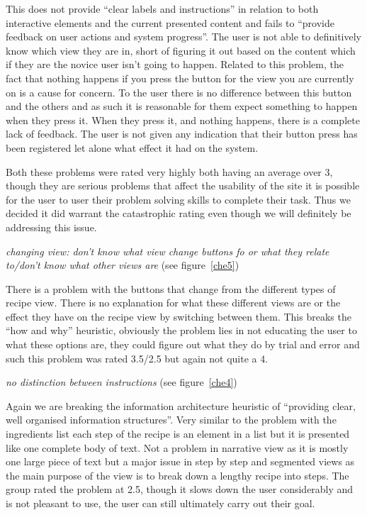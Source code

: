 This does not provide “clear labels and instructions” in relation to both interactive elements and the current presented content and fails to “provide feedback on user actions and system progress”. The user is not able to definitively know which view they are in, short of figuring it out based on the content which if they are the novice user isn’t going to happen. Related to this problem, the fact that nothing happens if you press the button for the view you are currently on is a cause for concern. To the user there is no difference between this button and the others and as such it is reasonable for them expect something to happen when they press it. When they press it, and nothing happens, there is a complete lack of feedback. The user is not given any indication that their button press has been registered let alone what effect it had on the system. 

Both these problems were rated very highly both having an average over 3, though they are serious problems that affect the usability of the site it is possible for the user to user their problem solving skills to complete their task. Thus we decided it did warrant the catastrophic rating even though we will definitely be addressing this issue.

\begin{center}
\emph{changing view: don't know what view change buttons fo or what they relate to/don't know what other views are} (see figure~\ref{che5})
\end{center}
There is a problem with the buttons that change from the different types of recipe view. There is no explanation for what these different views are or the effect they have on the recipe view by switching between them. This breaks the “how and why” heuristic, obviously the problem lies in not educating the user to what these options are, they could figure out what they do by trial and error and such this problem was rated 3.5/2.5 but again not quite a 4. 

\begin{center}
\emph{no distinction between instructions} (see figure~\ref{che4})
\end{center}
Again we are breaking the information architecture heuristic of “providing clear, well organised information structures”. Very similar to the problem with the ingredients list each step of the recipe is an element in a list but it is presented like one complete body of text. Not a problem in narrative view as it is mostly one large piece of text but a major issue in step by step and segmented views as the main purpose of the view is to break down a lengthy recipe into steps. The group rated the problem at 2.5, though it slows down the user considerably and is not pleasant to use, the user can still ultimately carry out their goal.

